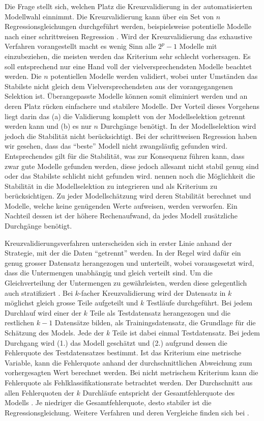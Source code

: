 Die Frage stellt sich, welchen Platz die Kreuzvalidierung in der automatisierten Modellwahl einnimmt.
Die Kreuzvalidierung kann über ein Set von $n$ Regressionsgleichungen durchgeführt werden, beispielsweise  potentielle Modelle nach einer schrittweisen Regression \cite[p. 12]{arlot2010survey}. Wird der Kreuzvalidierung das exhaustive Verfahren vorangestellt macht es wenig Sinn alle $2^p-1$ Modelle mit einzubeziehen, die meisten werden das Kriterium sehr schlecht vorhersagen.  Es soll entsprechend nur eine Hand voll der vielversprechendsten Modelle beachtet werden. 
Die $n$ potentiellen Modelle werden validiert, wobei unter Umständen das Stabilste nicht gleich dem Vielversprechendsten aus der vorangegangenen Selektion ist.
Überangepasste Modelle können somit eliminiert werden und an deren Platz rücken einfachere und stabilere Modelle.
Der Vorteil dieses Vorgehens liegt darin das (a) die Validierung komplett von der Modellselektion getrennt werden kann und (b) es nur $n$ Durchgänge benötigt. 
In der Modellselektion wird jedoch die Stabilität nicht berücksichtigt. 
Bei der schrittweisen Regression haben wir gesehen, dass das ``beste'' Modell nicht zwangsläufig gefunden wird.
Entsprechendes gilt für die Stabilität, was zur Konsequenz führen kann, dass zwar gute Modelle gefunden werden, diese jedoch allesamt nicht stabil genug sind oder das Stabilste schlicht nicht gefunden wird. 
 nennen noch die Möglichkeit die Stabilität in die Modellselektion zu integrieren und als  Kriterium zu berücksichtigen. 
Zu jeder Modellschätzung wird deren Stabilität berechnet und Modelle, welche keine genügenden Werte aufweisen, werden verworfen. 
Ein Nachteil dessen ist der höhere Rechenaufwand, da jedes Modell zusätzliche Durchgänge benötigt. 

Kreuzvalidierungsverfahren unterscheiden sich in erster Linie anhand der Strategie, mit der die Daten ``getrennt'' werden.
In der Regel wird dafür ein genug grosser Datensatz herangezogen und unterteilt, wobei vorausgesetzt wird, dass die Untermengen unabhängig und gleich verteilt sind.
Um die Gleichverteilung der Untermengen zu gewährleisten, werden diese gelegentlich auch stratifiziert \cite{diamantidis2000unsupervised}.
Bei $k$-facher Kreuzvalidierung wird der Datensatz in $k$ möglichst gleich grosse Teile aufgeteilt und $k$ Testläufe durchgeführt. Bei jedem Durchlauf wird einer der $k$ Teile als Testdatensatz herangezogen und die restlichen $k-1$ Datensätze bilden, als Trainingsdatensatz, die Grundlage für die Schätzung des Models. Jede der $k$ Teile ist dabei einmal Testdatensatz. Bei jedem Durchgang wird (1.) das Modell geschätzt und (2.) aufgrund dessen die Fehlerquote des Testdatensatzes bestimmt. Ist das Kriterium eine metrische Variable, kann die Fehlerquote anhand der durchschnittlichen Abweichung zum vorhergesagten Wert berechnet werden. Bei nicht metrischem Kriterium kann die Fehlerquote als Fehlklassifikationsrate betrachtet werden. 
Der Durchschnitt aus allen Fehlerquoten der $k$ Durchläufe entspricht der Gesamtfehlerquote des Modells \cite[p. 14]{arlot2010survey}.
Je niedriger die Gesamtfehlerquote, desto stabiler ist die Regressionsgleichung.
Weitere Verfahren und deren Vergleiche finden sich bei .

